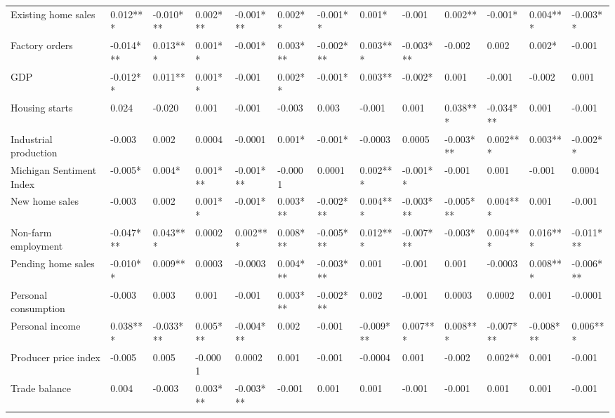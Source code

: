 \begin{landscape}
\begin{table}[]
{\begin{tabular}{lllllllllllll}
Existing home sales      & 0.012***  & -0.010*** & 0.002***  & -0.001*** & 0.002**  & -0.001**  & 0.001*    & -0.001    & 0.002**   & -0.001*   & 0.004***  & -0.003**  \\
Factory orders           & -0.014*** & 0.013***  & 0.001**   & -0.001*   & 0.003*** & -0.002*** & 0.003***  & -0.003*** & -0.002    & 0.002     & 0.002*    & -0.001    \\
GDP                      & -0.012**  & 0.011**   & 0.001**   & -0.001    & 0.002**  & -0.001*   & 0.003**   & -0.002*   & 0.001     & -0.001    & -0.002    & 0.001     \\
Housing starts           & 0.024     & -0.020    & 0.001     & -0.001    & -0.003   & 0.003     & -0.001    & 0.001     & 0.038***  & -0.034*** & 0.001     & -0.001    \\
Industrial production    & -0.003    & 0.002     & 0.0004    & -0.0001   & 0.001*   & -0.001*   & -0.0003   & 0.0005    & -0.003*** & 0.002***  & 0.003**   & -0.002**  \\
Michigan Sentiment Index & -0.005*   & 0.004*    & 0.001***  & -0.001*** & -0.0001  & 0.0001    & 0.002***  & -0.001**  & -0.001    & 0.001     & -0.001    & 0.0004    \\
New home sales           & -0.003    & 0.002     & 0.001**   & -0.001*   & 0.003*** & -0.002*** & 0.004***  & -0.003*** & -0.005*** & 0.004***  & 0.001     & -0.001    \\
Non-farm employment      & -0.047*** & 0.043***  & 0.0002    & 0.002***  & 0.008*** & -0.005*** & 0.012***  & -0.007*** & -0.003*   & 0.004***  & 0.016***  & -0.011*** \\
Pending home sales       & -0.010**  & 0.009**   & 0.0003    & -0.0003   & 0.004*** & -0.003*** & 0.001     & -0.001    & 0.001     & -0.0003   & 0.008***  & -0.006*** \\
Personal consumption     & -0.003    & 0.003     & 0.001     & -0.001    & 0.003*** & -0.002*** & 0.002     & -0.001    & 0.0003    & 0.0002    & 0.001     & -0.0001   \\
Personal income          & 0.038***  & -0.033*** & 0.005***  & -0.004*** & 0.002    & -0.001    & -0.009*** & 0.007***  & 0.008***  & -0.007*** & -0.008*** & 0.006***  \\
Producer price index     & -0.005    & 0.005     & -0.0001   & 0.0002    & 0.001    & -0.001    & -0.0004   & 0.001     & -0.002    & 0.002**   & 0.001     & -0.001    \\
Trade balance            & 0.004     & -0.003    & 0.003***  & -0.003*** & -0.001   & 0.001     & 0.001     & -0.001    & -0.001    & 0.001     & 0.001     & -0.001    \\ \hline

\end{tabular}}
\end{table}
\end{landscape}
